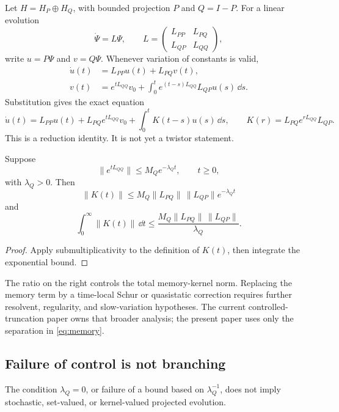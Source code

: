 \documentclass[11pt]{article}
\begin{document}
Let \(H=H_P\oplus H_Q\), with bounded projection \(P\) and \(Q=I-P\).
For a linear evolution
\[
\dot\Psi=L\Psi,
\qquad
L=
\begin{pmatrix}
L_{PP}&L_{PQ}\\
L_{QP}&L_{QQ}
\end{pmatrix},
\]
write \(u=P\Psi\) and \(v=Q\Psi\). Whenever variation of constants is valid,
\begin{align}
\dot u(t)&=L_{PP}u(t)+L_{PQ}v(t),\\
v(t)&=e^{tL_{QQ}}v_0+
\int_0^t e^{(t-s)L_{QQ}}L_{QP}u(s)\,\dd s.
\end{align}
Substitution gives the exact equation
\begin{equation}
\dot u(t)
=L_{PP}u(t)+L_{PQ}e^{tL_{QQ}}v_0
+\int_0^t K(t-s)u(s)\,\dd s,
\qquad
K(r)=L_{PQ}e^{rL_{QQ}}L_{QP}.
\label{eq:memory}
\end{equation}
This is a reduction identity. It is not yet a twistor statement.

\begin{proposition}
\label{prop:memory}
Suppose
\[
\|e^{tL_{QQ}}\|\leq M_Qe^{-\lambda_Qt},
\qquad t\geq0,
\]
with \(\lambda_Q>0\). Then
\[
\|K(t)\|
\leq
M_Q\|L_{PQ}\|\,\|L_{QP}\|e^{-\lambda_Qt}
\]
and
\[
\int_0^\infty\|K(t)\|\,\dd t
\leq
\frac{M_Q\|L_{PQ}\|\,\|L_{QP}\|}{\lambda_Q}.
\]
\end{proposition}

\begin{proof}
Apply submultiplicativity to the definition of \(K(t)\), then integrate the
exponential bound.
\end{proof}

The ratio on the right controls the total memory-kernel norm. Replacing the
memory term by a time-local Schur or quasistatic correction requires further
resolvent, regularity, and slow-variation hypotheses. The current
controlled-truncation paper owns that broader analysis; the present paper
uses only the separation in \cref{eq:memory}.

\subsection{Failure of control is not branching}

\begin{proposition}
\label{prop:no-kernel}
The condition \(\lambda_Q=0\), or failure of a bound based on
\(\lambda_Q^{-1}\), does not imply stochastic, set-valued, or kernel-valued
projected evolution.
\end{proposition}
\end{document}
